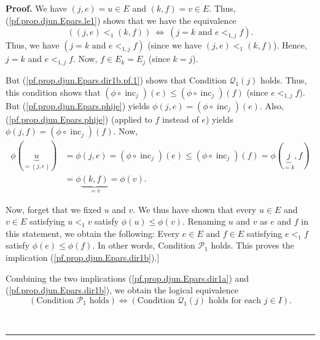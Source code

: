 \documentclass[numbers=enddot,12pt,final,onecolumn,notitlepage,abstracton]{scrartcl}
\theoremstyle{definition}
\newenvironment{proof}[1][Proof]{\noindent\textbf{#1.} }{\ \rule{0.5em}{0.5em}}
\newenvironment{verlong}{}{}
\begin{document}
\begin{verlong}
\begin{footnotesize}
\begin{proof}
We have $\left(  j,e\right)  =u\in E$ and $\left(  k,f\right)  =v\in E$. Thus,
(\ref{pf.prop.djun.Epars.le1}) shows that we have the equivalence%
\[
\left(  \left(  j,e\right)  <_{1}\left(  k,f\right)  \right)
\ \Longleftrightarrow\ \left(  j=k\text{ and }e<_{1,j}f\right)  .
\]
Thus, we have $\left(  j=k\text{ and }e<_{1,j}f\right)  $ (since we have
$\left(  j,e\right)  <_{1}\left(  k,f\right)  $). Hence, $j=k$ and $e<_{1,j}%
f$. Now, $f\in E_{k}=E_{j}$ (since $k=j$).

But (\ref{pf.prop.djun.Epars.dir1b.pf.1}) shows that Condition $\mathcal{Q}%
_{1}\left(  j\right)  $ holds. Thus, this condition shows that $\left(
\phi\circ\operatorname*{inc}\nolimits_{j}\right)  \left(  e\right)
\leq\left(  \phi\circ\operatorname*{inc}\nolimits_{j}\right)  \left(
f\right)  $ (since $e<_{1,j}f$). But (\ref{pf.prop.djun.Epars.phije}) yields
$\phi\left(  j,e\right)  =\left(  \phi\circ\operatorname*{inc}\nolimits_{j}%
\right)  \left(  e\right)  $. Also, (\ref{pf.prop.djun.Epars.phije}) (applied
to $f$ instead of $e$) yields $\phi\left(  j,f\right)  =\left(  \phi
\circ\operatorname*{inc}\nolimits_{j}\right)  \left(  f\right)  $. Now,%
\begin{align*}
\phi\left(  \underbrace{u}_{=\left(  j,e\right)  }\right)   &  =\phi\left(
j,e\right)  =\left(  \phi\circ\operatorname*{inc}\nolimits_{j}\right)  \left(
e\right)  \leq\left(  \phi\circ\operatorname*{inc}\nolimits_{j}\right)
\left(  f\right)  =\phi\left(  \underbrace{j}_{=k},f\right) \\
&  =\phi\underbrace{\left(  k,f\right)  }_{=v}=\phi\left(  v\right)  .
\end{align*}


Now, forget that we fixed $u$ and $v$. We thus have shown that every $u\in E$
and $v\in E$ satisfying $u<_{1}v$ satisfy $\phi\left(  u\right)  \leq
\phi\left(  v\right)  $. Renaming $u$ and $v$ as $e$ and $f$ in this
statement, we obtain the following: Every $e\in E$ and $f\in E$ satisfying
$e<_{1}f$ satisfy $\phi\left(  e\right)  \leq\phi\left(  f\right)  $. In other
words, Condition $\mathcal{P}_{1}$ holds. This proves the implication
(\ref{pf.prop.djun.Epars.dir1b}).]

Combining the two implications (\ref{pf.prop.djun.Epars.dir1a}) and
(\ref{pf.prop.djun.Epars.dir1b}), we obtain the logical equivalence%
\begin{equation}
\left(  \text{Condition }\mathcal{P}_{1}\text{ holds}\right)
\Longleftrightarrow\left(  \text{Condition }\mathcal{Q}_{1}\left(  j\right)
\text{ holds for each }j\in I\right)  . \label{pf.prop.djun.Epars.dir1}%
\end{equation}



\end{proof}
\end{footnotesize}
\end{verlong}
\end{document}
